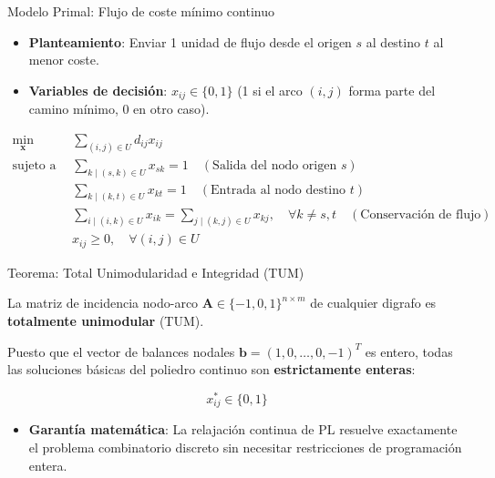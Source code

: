 \documentclass[
  ignorenonframetext,
]{beamer}
\providecommand{\tightlist}{%
  \setlength{\itemsep}{0pt}\setlength{\parskip}{0pt}}
\begin{document}
\begin{frame}{Modelo Primal: Flujo de coste mínimo continuo}
\label{modelo-primal-flujo-de-coste-muxednimo-continuo}
\begin{itemize}
\item
  \textbf{Planteamiento}: Enviar 1 unidad de flujo desde el origen \(s\)
  al destino \(t\) al menor coste.
\item
  \textbf{Variables de decisión}: \(x_{ij} \in \{0, 1\}\) (1 si el arco
  \((i,j)\) forma parte del camino mínimo, 0 en otro caso).
\end{itemize}

\[
\begin{aligned}
\min_{\mathbf{x}} \quad & \sum_{(i,j) \in U} d_{ij} x_{ij} \\
\text{sujeto a} \quad & \sum_{k \mid (s,k) \in U} x_{sk} = 1 \quad (\text{Salida del nodo origen } s) \\
& \sum_{k \mid (k,t) \in U} x_{kt} = 1 \quad (\text{Entrada al nodo destino } t) \\
& \sum_{i \mid (i,k) \in U} x_{ik} = \sum_{j \mid (k,j) \in U} x_{kj}, \quad \forall k \neq s, t \quad (\text{Conservación de flujo}) \\
& x_{ij} \ge 0, \quad \forall (i, j) \in U
\end{aligned}
\]
\end{frame}

\begin{frame}{Teorema: Total Unimodularidad e Integridad (TUM)}
\label{teorema-total-unimodularidad-e-integridad-tum}
\begin{tcolorbox}[enhanced jigsaw, colframe=quarto-callout-important-color-frame, toptitle=1mm, colback=white, colbacktitle=quarto-callout-important-color!10!white, titlerule=0mm, breakable, coltitle=black, opacityback=0, bottomrule=.15mm, title=\textcolor{quarto-callout-important-color}{\faExclamation}\hspace{0.5em}{Total Unimodularidad de la matriz de incidencia}, rightrule=.15mm, arc=.35mm, leftrule=.75mm, left=2mm, toprule=.15mm, bottomtitle=1mm, opacitybacktitle=0.6]

La matriz de incidencia nodo-arco
\(\mathbf{A} \in \{-1, 0, 1\}^{n \times m}\) de cualquier digrafo es
\textbf{totalmente unimodular} (TUM).

Puesto que el vector de balances nodales
\(\mathbf{b} = (1, 0, \dots, 0, -1)^T\) es entero, todas las soluciones
básicas del poliedro continuo son \textbf{estrictamente enteras}:

\[x_{ij}^* \in \{0, 1\}\]

\end{tcolorbox}

\begin{itemize}
\tightlist
\item
  \textbf{Garantía matemática}: La relajación continua de PL resuelve
  exactamente el problema combinatorio discreto sin necesitar
  restricciones de programación entera.
\end{itemize}
\end{frame}
\end{document}
